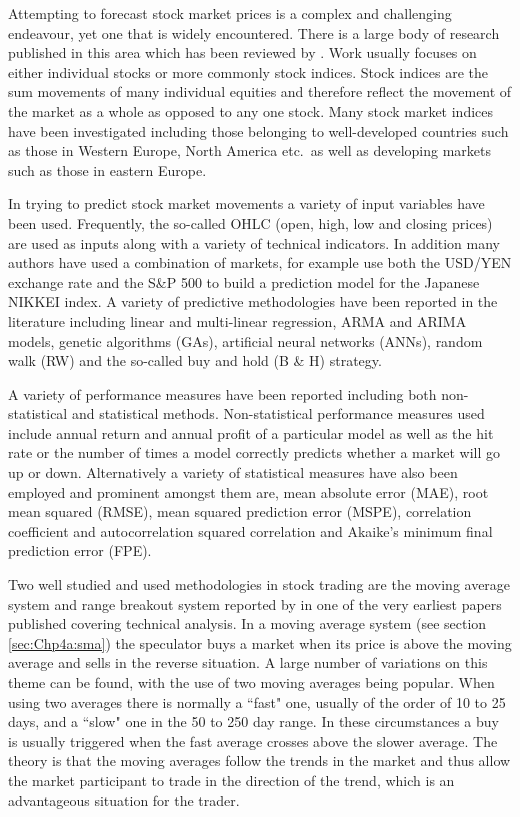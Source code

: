 Attempting to forecast stock market prices is a complex and challenging endeavour, yet one that is widely encountered. There is a large body of research published in this area which has been reviewed by \cite{Atsalakis20095932}. Work usually focuses on either individual stocks or more commonly stock indices. Stock indices are the sum movements of many individual equities and therefore reflect the movement of the market as a whole as opposed to any one stock. Many stock market indices have been investigated including those belonging to well-developed countries such as those in Western Europe, North America etc.\ as well as developing markets such as those in eastern Europe.

In trying to predict stock market movements a variety of input variables have been used. Frequently, the so-called OHLC (open, high, low and closing prices) are used as inputs along with a variety of technical indicators. In addition many authors have used a combination of markets, for example \cite{Huang20052513} use both the USD/YEN exchange rate and the S\&P 500 to build a prediction model for the Japanese NIKKEI index. A variety of predictive methodologies have been reported in the literature including linear and multi-linear regression, ARMA and ARIMA models, genetic algorithms (GAs), artificial neural networks (ANNs), random walk (RW) and the so-called buy and hold (B \& H) strategy.

A variety of performance measures have been reported including both non-statistical and statistical methods. Non-statistical performance measures used include annual return and annual profit of a particular model as well as the hit rate or the number of times a model correctly predicts whether a market will go up or down. Alternatively a variety of statistical measures have also been employed and prominent amongst them are, mean absolute error (MAE), root mean squared (RMSE), mean squared prediction error (MSPE), correlation coefficient and autocorrelation squared correlation and Akaike’s minimum final prediction error (FPE).

Two well studied and used methodologies in stock trading are the moving average system and range breakout system reported by \citep{Brock} in one of the very earliest papers published covering technical analysis. In a moving average system (see section \ref{sec:Chp4a:sma}) the speculator buys a market when its price is above the moving average and sells in the reverse situation. A large number of variations on this theme can be found, with the use of two moving averages being popular. When using two averages there is normally a \textquotedblleft fast" one, usually of the order of 10 to 25 days,  and a \textquotedblleft slow" one in the 50 to 250 day range. In these circumstances a buy is usually triggered when the fast average crosses above the slower average. The theory is that the moving averages follow the trends in the market and thus allow the market participant to trade in the direction of the trend, which is an advantageous situation for the trader.

